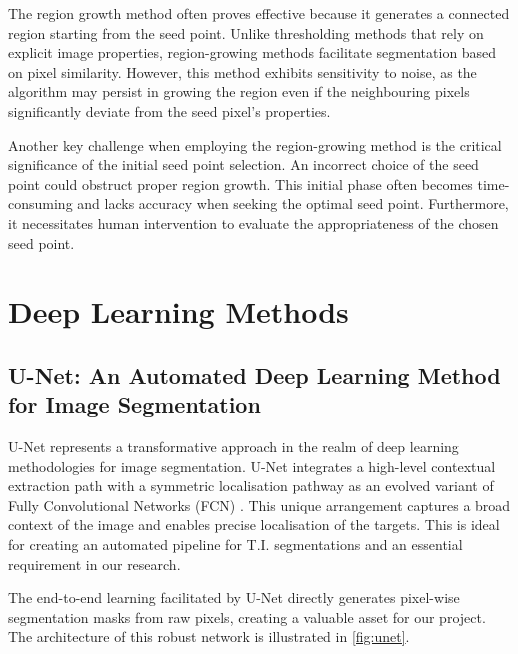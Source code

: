 The region growth method often proves effective because it generates a connected region starting from the seed point. Unlike thresholding methods that rely on explicit image properties, region-growing methods facilitate segmentation based on pixel similarity. However, this method exhibits sensitivity to noise, as the algorithm may persist in growing the region even if the neighbouring pixels significantly deviate from the seed pixel's properties.

Another key challenge when employing the region-growing method is the critical significance of the initial seed point selection. An incorrect choice of the seed point could obstruct proper region growth. This initial phase often becomes time-consuming and lacks accuracy when seeking the optimal seed point. Furthermore, it necessitates human intervention to evaluate the appropriateness of the chosen seed point.

\section{Deep Learning Methods}
\subsection{U-Net: An Automated Deep Learning Method for Image Segmentation}

U-Net \cite{ronneberger2015u} represents a transformative approach in the realm of deep learning methodologies for image segmentation. U-Net integrates a high-level contextual extraction path with a symmetric localisation pathway as an evolved variant of Fully Convolutional Networks (FCN) \cite{long2015fully}. This unique arrangement captures a broad context of the image and enables precise localisation of the targets. This is ideal for creating an automated pipeline for T.I. segmentations and an essential requirement in our research. 

The end-to-end learning facilitated by U-Net directly generates pixel-wise segmentation masks from raw pixels, creating a valuable asset for our project. The architecture of this robust network is illustrated in \autoref{fig:unet}.

